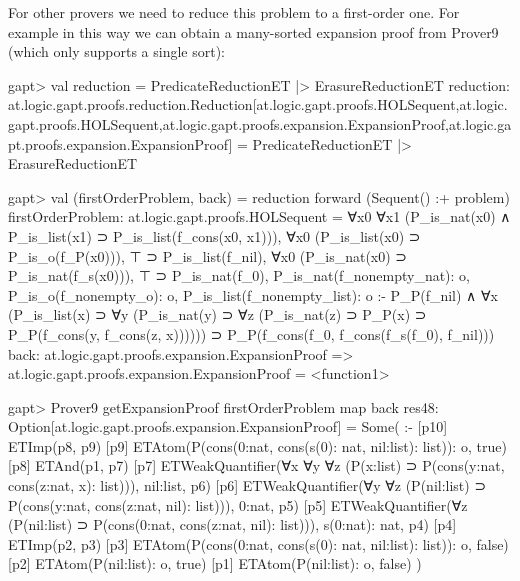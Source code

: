 \documentclass[a4paper,11pt]{article}
\begin{document}
For other provers we need to reduce this problem to a first-order one.  For
example in this way we can obtain a many-sorted expansion proof from Prover9
(which only supports a single sort):
\begin{clilisting}
gapt> val reduction = PredicateReductionET |> ErasureReductionET
reduction: at.logic.gapt.proofs.reduction.Reduction[at.logic.gapt.proofs.HOLSequent,at.logic.gapt.proofs.HOLSequent,at.logic.gapt.proofs.expansion.ExpansionProof,at.logic.gapt.proofs.expansion.ExpansionProof] = PredicateReductionET |> ErasureReductionET

gapt> val (firstOrderProblem, back) = reduction forward (Sequent() :+ problem)
firstOrderProblem: at.logic.gapt.proofs.HOLSequent =
∀x0 ∀x1 (P_is_nat(x0) ∧ P_is_list(x1) ⊃ P_is_list(f_cons(x0, x1))),
∀x0 (P_is_list(x0) ⊃ P_is_o(f_P(x0))),
⊤ ⊃ P_is_list(f_nil),
∀x0 (P_is_nat(x0) ⊃ P_is_nat(f_s(x0))),
⊤ ⊃ P_is_nat(f_0),
P_is_nat(f_nonempty_nat): o,
P_is_o(f_nonempty_o): o,
P_is_list(f_nonempty_list): o
:-
P_P(f_nil) ∧
    ∀x (P_is_list(x) ⊃
        ∀y (P_is_nat(y) ⊃
            ∀z (P_is_nat(z) ⊃ P_P(x) ⊃ P_P(f_cons(y, f_cons(z, x)))))) ⊃
  P_P(f_cons(f_0, f_cons(f_s(f_0), f_nil)))
back: at.logic.gapt.proofs.expansion.ExpansionProof => at.logic.gapt.proofs.expansion.ExpansionProof = <function1>

gapt> Prover9 getExpansionProof firstOrderProblem map back
res48: Option[at.logic.gapt.proofs.expansion.ExpansionProof] =
Some(
:-
[p10] ETImp(p8, p9)
[p9] ETAtom(P(cons(0:nat, cons(s(0): nat, nil:list): list)): o, true)
[p8] ETAnd(p1, p7)
[p7] ETWeakQuantifier(∀x ∀y ∀z (P(x:list) ⊃ P(cons(y:nat, cons(z:nat, x): list))), nil:list, p6)
[p6] ETWeakQuantifier(∀y ∀z (P(nil:list) ⊃ P(cons(y:nat, cons(z:nat, nil): list))), 0:nat, p5)
[p5] ETWeakQuantifier(∀z (P(nil:list) ⊃ P(cons(0:nat, cons(z:nat, nil): list))), s(0:nat): nat, p4)
[p4] ETImp(p2, p3)
[p3] ETAtom(P(cons(0:nat, cons(s(0): nat, nil:list): list)): o, false)
[p2] ETAtom(P(nil:list): o, true)
[p1] ETAtom(P(nil:list): o, false)
)

\end{clilisting}
\end{document}
